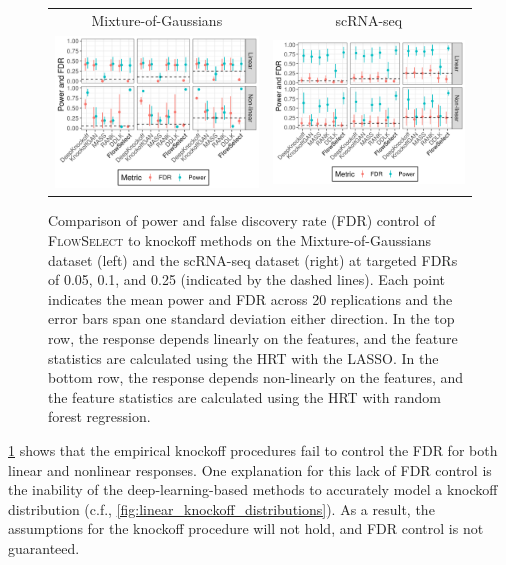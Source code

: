 \documentclass{article}
\newcommand{\FlowSelect}{\textsc{FlowSelect}\xspace}
\begin{document}
\begin{figure}
    \centering
    \begin{tabular}{cc}
    Mixture-of-Gaussians & scRNA-seq \\
    \includegraphics[width=0.485\linewidth]{./fig/gaussian_ar_mixture_d100_n100000_rho0.98__meanplots.png}&\includegraphics[width=0.485\linewidth]{fig/rnasq_cor_a40_n10_nv100_nvc5_nt100000__meanplots.png}
    \end{tabular}
    \caption{Comparison of power and false discovery rate (FDR) control of \FlowSelect to knockoff methods on the Mixture-of-Gaussians dataset (left) and the scRNA-seq dataset (right) at targeted FDRs of 0.05, 0.1, and 0.25 (indicated by the dashed lines).
      Each point indicates the mean power and FDR across 20 replications and the error bars span one standard deviation either direction.
      In the top row, the response depends linearly on the features, and the feature statistics are calculated using the HRT with the LASSO.
      In the bottom row, the response depends non-linearly on the features, and the feature statistics are calculated using the HRT with random forest regression.
    }
    \label{fig:linear_fdr_boxplot}
\end{figure}
\cref{fig:linear_fdr_boxplot} shows that the empirical knockoff procedures fail to control the FDR for both linear and nonlinear responses.
One explanation for this lack of FDR control is the inability of the deep-learning-based methods to accurately model a knockoff distribution (c.f., \cref{fig:linear_knockoff_distributions}).
As a result, the assumptions for the knockoff procedure will not hold, and FDR control is not guaranteed.
\end{document}
